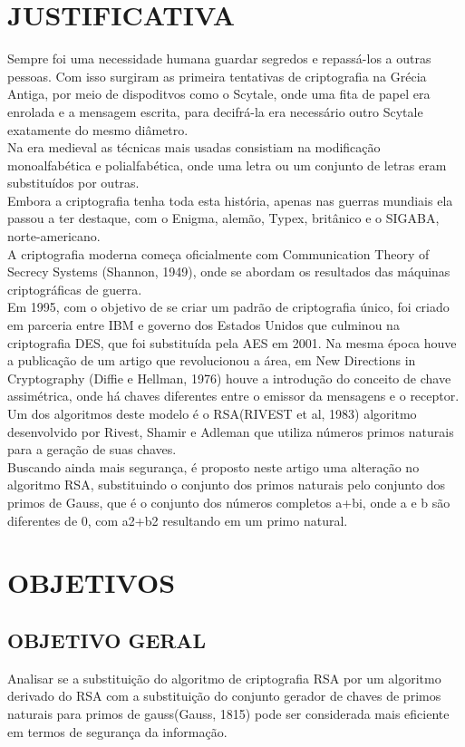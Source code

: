 \documentclass[]{article}
\begin{document}
\section{JUSTIFICATIVA}
Sempre foi uma necessidade humana guardar segredos e repassá-los a outras pessoas. Com isso surgiram as primeira tentativas de criptografia na Grécia Antiga, por meio de dispoditvos como o Scytale, onde uma fita de papel era enrolada e a mensagem escrita, para decifrá-la era necessário outro Scytale exatamente do mesmo diâmetro.\\
Na era medieval as técnicas mais usadas consistiam na modificação monoalfabética e polialfabética, onde uma letra ou um conjunto de letras eram substituídos por outras.\\
Embora a criptografia tenha toda esta história, apenas nas guerras mundiais ela passou a ter destaque, com o Enigma, alemão, Typex, britânico e o SIGABA, norte-americano.\\
A criptografia moderna começa oficialmente com Communication Theory of Secrecy Systems (Shannon, 1949), onde se abordam os resultados das máquinas criptográficas de guerra.\\
Em 1995, com o objetivo de se criar um padrão de criptografia único, foi criado em parceria entre IBM e governo dos Estados Unidos que culminou na criptografia DES, que foi substituída pela AES em 2001. Na mesma época houve a publicação de um artigo que revolucionou a área, em New Directions in Cryptography (Diffie e Hellman, 1976) houve a introdução do conceito de chave assimétrica, onde há chaves diferentes entre o emissor da mensagens e o receptor.\\
Um dos algoritmos deste modelo é o RSA(RIVEST et al, 1983) algoritmo  desenvolvido por Rivest, Shamir e Adleman que utiliza números primos naturais para a geração de suas chaves.\\
Buscando ainda mais segurança, é proposto neste artigo uma alteração no algoritmo RSA, substituindo o conjunto dos primos naturais pelo conjunto dos primos de Gauss, que é o conjunto dos números completos a+bi, onde a e b são diferentes de 0, com a2+b2 resultando em um primo natural.

\section{OBJETIVOS}
\subsection{OBJETIVO GERAL}
Analisar se a substituição do algoritmo de criptografia RSA por um algoritmo derivado do RSA com a substituição do conjunto gerador de chaves de primos naturais para primos de gauss(Gauss, 1815) pode ser considerada mais eficiente em termos de segurança da informação.
\end{document}
